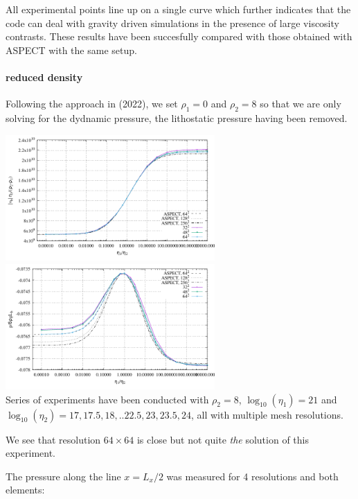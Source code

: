 All experimental points line up on a single curve which further
indicates that the code can deal with gravity driven simulations in the presence
of large viscosity contrasts. These results have been succesfully compared with 
those obtained with ASPECT with the same setup.

\paragraph{reduced density}

Following the approach in \textcite{thba22} (2022), 
we set $\rho_1=0$ and $\rho_2=8$ so that we are only solving for the dydnamic 
pressure, the lithostatic pressure having been removed.

\begin{center}
\includegraphics[width=8cm]{python_codes/fieldstone_53/results/reduced/results_v.pdf}
\includegraphics[width=8cm]{python_codes/fieldstone_53/results/reduced/results_p.pdf}\\
{\captionfont
Series of experiments have been conducted with $\rho_2=8$, 
$\log_{10}(\eta_1)=21$ and $\log_{10}(\eta_2)=17,17.5,18,..22.5,23,23.5,24$, 
all with multiple mesh resolutions.}
 \end{center}

We see that resolution $64\times 64$ is close but not quite {\sl the} solution of this experiment.

The pressure along the line $x=L_x/2$ was measured for 4 resolutions and both elements:
 
